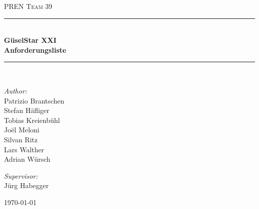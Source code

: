 \begin{titlepage}   

\begin{center}
\textsc{\Large PREN Team 39}\\[0.5cm]

\newcommand{\HRule}{\rule{\linewidth}{0.5mm}}
\HRule \\[0.4cm]
{ \huge \bfseries GüselStar XXI}\\[0.4cm]
{ \huge \bfseries Anforderungsliste}\\[0.4cm]
\HRule \\[1.5cm]

\begin{minipage}{0.4\textwidth}
\begin{flushleft} \large
\emph{Author:}\\
Patrizio Brantschen\\
Stefan Häfliger\\
Tobias Kreienbühl\\
Joël Meloni\\
Silvan Ritz\\
Lars Walther\\
Adrian Würsch
\end{flushleft}
\end{minipage}
\hfill
\begin{minipage}{0.4\textwidth}
\begin{flushright} \large
\emph{Supervisor:} \\
Jürg Habegger
\end{flushright}
\end{minipage}

\vfill

{\large \today}

\end{center}
\end{titlepage}